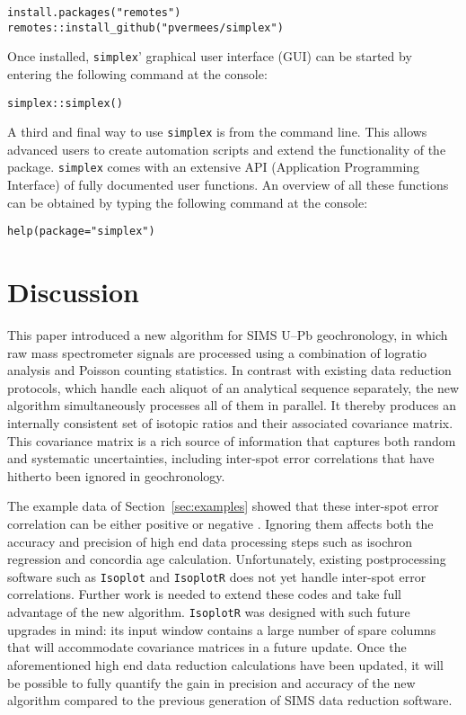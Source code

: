 \documentclass{article}
\begin{document}
\begin{verbatim}
install.packages("remotes")
remotes::install_github("pvermees/simplex")
\end{verbatim}

Once installed, \texttt{simplex}' graphical user interface (GUI) can
be started by entering the following command at the console:

\begin{verbatim}
simplex::simplex()
\end{verbatim}

A third and final way to use \texttt{simplex} is from the command
line.  This allows advanced users to create automation scripts and
extend the functionality of the package. \texttt{simplex} comes with
an extensive API (Application Programming Interface) of fully
documented user functions. An overview of all these functions can be
obtained by typing the following command at the console:

\begin{verbatim}
help(package="simplex")
\end{verbatim}

\section{Discussion}  %

This paper introduced a new algorithm for SIMS U--Pb geochronology, in
which raw mass spectrometer signals are processed using a combination
of logratio analysis and Poisson counting statistics. In contrast with
existing data reduction protocols, which handle each aliquot of an
analytical sequence separately, the new algorithm simultaneously
processes all of them in parallel. It thereby produces an internally
consistent set of isotopic ratios and their associated covariance
matrix. This covariance matrix is a rich source of information that
captures both random and systematic uncertainties, including
inter-spot error correlations that have hitherto been ignored in
geochronology.\medskip

The example data of Section~\ref{sec:examples} showed that these
inter-spot error correlation can be either positive or negative
\citep[see also][]{vermeesch2015b,mclean2016}. Ignoring them affects
both the accuracy and precision of high end data processing steps such
as isochron regression and concordia age calculation. Unfortunately,
existing postprocessing software such as \texttt{Isoplot}
\citep{ludwig2003} and \texttt{IsoplotR} \citep{vermeesch2018c} does
not yet handle inter-spot error correlations. Further work is needed
to extend these codes and take full advantage of the new
algorithm. \texttt{IsoplotR} was designed with such future upgrades in
mind: its input window contains a large number of spare columns that
will accommodate covariance matrices in a future update.  Once the
aforementioned high end data reduction calculations have been updated,
it will be possible to fully quantify the gain in precision and
accuracy of the new algorithm compared to the previous generation of
SIMS data reduction software.\medskip
\end{document}
